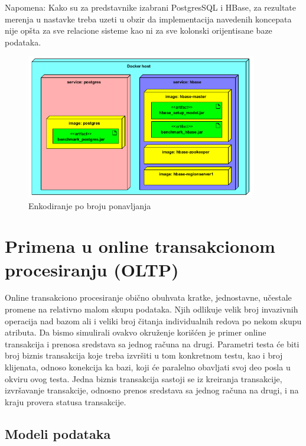 \documentclass[12pt,oneside]{memoir}
\begin{document}
Napomena: Kako su za predstavnike izabrani PostgresSQL i HBase,  za rezultate merenja u nastavke treba uzeti u obzir da implementacija navedenih koncepata nije opšta za sve relacione sisteme kao ni za sve kolonski orijentisane baze podataka.


\begin{figure}[!ht]
  \centering
  \includegraphics[width=0.9\textwidth]{deployment_diagram.png}
  \caption{Enkodiranje po broju ponavljanja}
  \label{fig:grafikon}
\end{figure}

\pagebreak

\section{Primena u online transakcionom procesiranju (OLTP)}

Online transakciono procesiranje obično obuhvata kratke, jednostavne, učestale promene  na relativno malom skupu podataka. Njih odlikuje velik broj invazivnih operacija nad bazom ali i veliki broj čitanja individualnih redova po nekom skupu atributa. Da bismo simulirali ovakvo okruženje korišćen je primer online transakcija i prenosa sredstava sa jednog računa na drugi. Parametri testa će biti broj biznis transakcija koje treba izvršiti u tom konkretnom testu, kao i broj klijenata, odnoso konekcija ka bazi, koji će paralelno obavljati svoj deo posla u okviru ovog testa. Jedna biznis transakcija sastoji se iz kreiranja transakcije, izvršavanje transakcije, odnosno prenos sredstava sa jednog računa na drugi, i na kraju provera statusa transakcije. 


\subsection{Modeli podataka}
\end{document}

